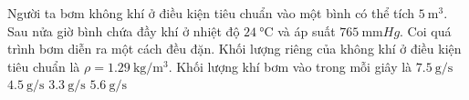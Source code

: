 \begin{ex}
	Người ta bơm không khí ở điều kiện tiêu chuẩn vào một bình có thể tích $\SI{5}{\meter^3}$. Sau nửa giờ bình chứa đầy khí ở nhiệt độ $\SI{24}{\celsius}$ và áp suất $\SI{765}{\milli\meter Hg}$. Coi quá trình bơm diễn ra một cách đều đặn. Khối lượng riêng của không khí ở điều kiện tiêu chuẩn là $\rho=\SI{1.29}{\kilogram/\meter^3}$. Khối lượng khí bơm vào trong mỗi giây là
	\choice
	{$\SI{7.5}{\gram/\second}$}
	{$\SI{4.5}{\gram/\second}$}
	{\True $\SI{3.3}{\gram/\second}$}
	{$\SI{5.6}{\gram/\second}$}
\end{ex}
